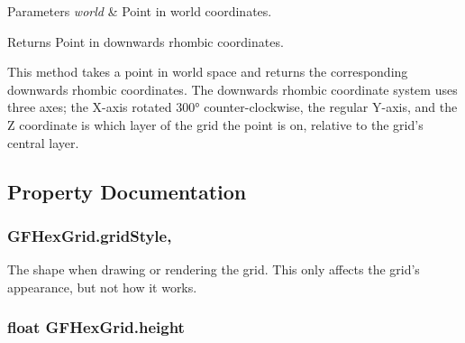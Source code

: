 \begin{DoxyParams}{Parameters}
{\em world} & Point in world coordinates.\\
\hline
\end{DoxyParams}
\begin{DoxyReturn}{Returns}
Point in downwards rhombic coordinates.
\end{DoxyReturn}


This method takes a point in world space and returns the corresponding downwards rhombic coordinates. The downwards rhombic coordinate system uses three axes; the X-\/axis rotated 300° counter-\/clockwise, the regular Y-\/axis, and the Z coordinate is which layer of the grid the point is on, relative to the grid's central layer. 

\subsection{Property Documentation}
\hypertarget{class_g_f_hex_grid_aa655390c4d3e1872978c50b964107dff_aa655390c4d3e1872978c50b964107dff}{
\subsubsection[{grid\+Style}]{ G\+F\+Hex\+Grid.\+grid\+Style\hspace{0.3cm}{\ttfamily [get]}, {\ttfamily [set]}}}\label{class_g_f_hex_grid_aa655390c4d3e1872978c50b964107dff_aa655390c4d3e1872978c50b964107dff}
The shape when drawing or rendering the grid. This only affects the grid’s appearance, but not how it works.\hypertarget{class_g_f_hex_grid_adef19e30b8a5c7e243d1f8239e270630_adef19e30b8a5c7e243d1f8239e270630}{
\subsubsection[{height}]{\setlength{\rightskip}{0pt plus 5cm}float G\+F\+Hex\+Grid.\+height\hspace{0.3cm}{\ttfamily [get]}}}\label{class_g_f_hex_grid_adef19e30b8a5c7e243d1f8239e270630_adef19e30b8a5c7e243d1f8239e270630}
